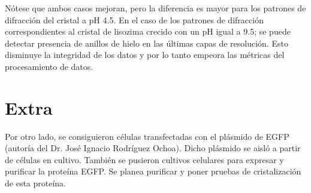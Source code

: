 \documentclass[11pt,letterpaper]{article}
\begin{document}
\begin{table}[h]
\centering
{}
\caption{Comparación entre procesamientos de datos.}
\label{tab:my-table2}
\end{table}
	 
Nótese que ambos casos mejoran, pero la diferencia es mayor para los patrones de difracción del cristal a pH \num{4.5}. En el caso de los patrones de difracción correspondientes al cristal de lisozima crecido con un pH igual a \num{9.5}; se puede detectar presencia de anillos de hielo en las últimas capas de resolución. Esto disminuye la integridad de los datos y por lo tanto empeora las métricas del procesamiento de datos.
\section{Extra}
Por otro lado, se consiguieron células transfectadas con el plásmido de EGFP (autoría del Dr. José Ignacio Rodríguez Ochoa). Dicho plásmido se aisló a partir de células en cultivo. También se pusieron cultivos celulares para expresar y purificar la proteína EGFP. Se planea purificar y poner pruebas de cristalización de esta proteína.
\end{document}
